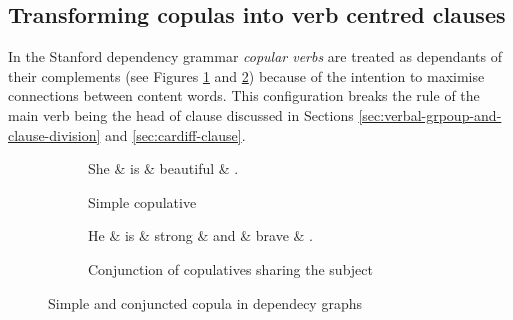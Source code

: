 \subsection{Transforming copulas into verb centred clauses}
\label{sec:copulas}
    In the Stanford dependency grammar \textit{copular verbs} are treated as dependants of their complements (see Figures \ref{fig:copula-simple} and \ref{fig:copula-conj}) because of the intention to maximise connections between content words. This configuration breaks the rule of the main verb being the head of clause discussed in Sections \ref{sec:verbal-grpoup-and-clause-division} and \ref{sec:cardiff-clause}. 

    \begin{figure}
    \centering
        \begin{subfigure}[b]{0.4\textwidth}
        \centering
        \begin{dependency}
        		\begin{deptext}[]
        	She \& is \& beautiful \& . \\%
        		\end{deptext}
        	\end{dependency}
        \caption{Simple copulative}
        \label{fig:copula-simple}
        \end{subfigure}
        \quad
        \begin{subfigure}[b]{0.55\textwidth}
        \centering
        	\begin{dependency}
        		\begin{deptext}[]
        	He \& is \& strong \& and \& brave \& . \\
        		\end{deptext}
        	\end{dependency}
        \caption{Conjunction of copulatives sharing the subject}
        \label{fig:copula-conj}
        \end{subfigure}
         \caption{Simple and conjuncted copula in dependecy graphs}
         \label{fig:copula-in-dg}
    \end{figure}
    
